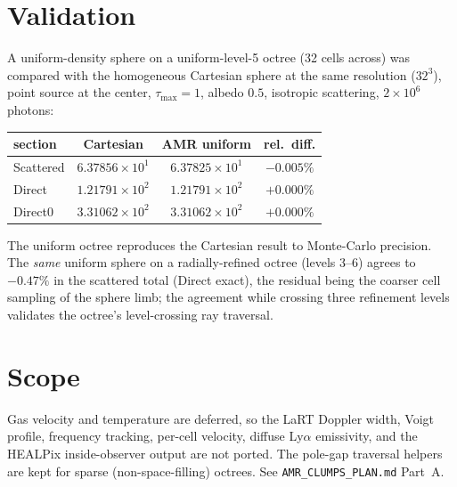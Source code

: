 \documentclass[english,a4paper]{kiseon_memo}
\begin{document}
\section{Validation}
A uniform-density sphere on a uniform-level-5 octree (32 cells across) was
compared with the homogeneous Cartesian sphere at the same resolution
($32^3$), point source at the center, $\tau_{\max}=1$, albedo $0.5$, isotropic
scattering, $2\times10^{6}$ photons:
\begin{center}
\begin{tabular}{lccc}
\hline
section    & Cartesian & AMR uniform & rel.\ diff.\\
\hline
Scattered  & $6.37856\times10^{1}$ & $6.37825\times10^{1}$ & $-0.005\%$\\
Direct     & $1.21791\times10^{2}$ & $1.21791\times10^{2}$ & $+0.000\%$\\
Direct0    & $3.31062\times10^{2}$ & $3.31062\times10^{2}$ & $+0.000\%$\\
\hline
\end{tabular}
\end{center}
The uniform octree reproduces the Cartesian result to Monte-Carlo precision.
The \emph{same} uniform sphere on a radially-refined octree (levels 3--6)
agrees to $-0.47\%$ in the scattered total (Direct exact), the residual being
the coarser cell sampling of the sphere limb; the agreement while crossing
three refinement levels validates the octree's level-crossing ray traversal.

\section{Scope}
Gas velocity and temperature are deferred, so the LaRT Doppler width, Voigt
profile, frequency tracking, per-cell velocity, diffuse Ly$\alpha$ emissivity,
and the HEALPix inside-observer output are not ported.  The pole-gap traversal
helpers are kept for sparse (non-space-filling) octrees.  See
\texttt{AMR\_CLUMPS\_PLAN.md} Part~A.
\end{document}
